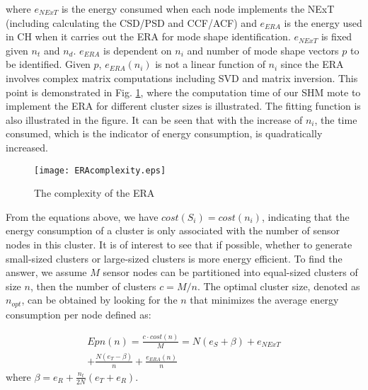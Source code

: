 where \(e_{NExT}\) is the energy consumed when each node implements the NExT (including calculating the CSD/PSD and CCF/ACF) and \(e_{ERA}\) is the energy used in CH when it carries out the ERA for mode shape identification. \(e_{NExT}\) is fixed given  \(n_t\) and \(n_d\). \(e_{ERA}\) is dependent on \(n_i\) and number of mode shape vectors \(p\) to be identified.  Given \(p\), \(e_{ERA}(n_i)\) is not a linear function of \(n_i\) since the ERA involves complex matrix computations including SVD and matrix inversion. This point is demonstrated in Fig. \ref{fig:ERAcomplexity}, where the computation time of our SHM mote to implement the ERA for different cluster sizes is illustrated. The fitting function is also illustrated in the figure. It can be seen that with the increase of \(n_i\), the time consumed, which is the indicator of energy consumption, is quadratically increased.
\begin{figure}
	\centering
		\texttt{[image: ERAcomplexity.eps]}
	\caption{The complexity of the ERA}
	\label{fig:ERAcomplexity}
\end{figure}

From the equations above, we have \(cost(S_i)=cost(n_i)\), indicating that the energy consumption of a cluster is only associated with the number of sensor nodes in this cluster. It is of interest to see that if possible, whether to generate small-sized clusters or large-sized clusters is more energy efficient.  To find the answer, we assume \(M\) sensor nodes can be partitioned into equal-sized clusters of size \(n\), then the number of clusters \(c = M/n\). The optimal cluster size, denoted as \(n_{opt}\), can be obtained by looking for the \(n\) that minimizes the average energy consumption per node defined as: 

\begin{align}
\label{eq:nooverlap}
Epn(n) = \frac{c\cdot cost(n)}{M} = N(e_S+\beta) + e_{NExT}\\ \nonumber 
+ \frac{N(e_T-\beta)}{n} + \frac{e_{ERA}(n)}{n} 
\end{align}
where \(\beta =e_R+\frac{n_t}{2N}(e_T+e_R)\).


